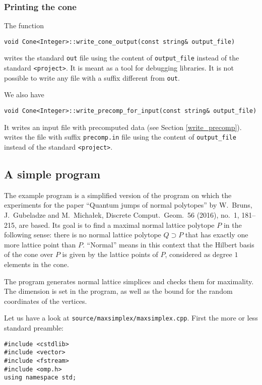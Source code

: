 \begin{small}
\subsubsection{Printing the cone}

The function
\begin{Verbatim}
void Cone<Integer>::write_cone_output(const string& output_file)
\end{Verbatim}
writes the standard \verb|out| file using the content of \verb|output_file| instead of the standard \verb|<project>|. It is meant as a tool for debugging libraries. It is not possible to write any file with a suffix different from \verb|out|.

We also have
\begin{Verbatim}
void Cone<Integer>::write_precomp_for_input(const string& output_file)
\end{Verbatim}
It writes an input file with precomputed data (see Section \ref{write_precomp}).
writes the file with suffix  \verb|precomp.in| file using the content of \verb|output_file| instead of the standard \verb|<project>|.

\subsection{A simple program}\label{maxsimplex}

The example program is a simplified version of the program on which the experiments for the paper ``Quantum jumps of normal polytopes'' by W.~Bruns, J.~Gubeladze and M.~Micha\l{}ek, Discrete Comput.\ Geom.\ 56 (2016), no.\ 1, 181--215, are based. Its goal is to find a maximal normal lattice polytope $P$ in the following sense: there is no normal lattice polytope $Q\supset P$ that has exactly one more lattice point than $P$. ``Normal'' means in this context that the Hilbert basis of the cone over $P$ is given by the lattice points of $P$, considered as degree $1$ elements in the cone.

The program generates normal lattice simplices and checks them for maximality. The dimension is set in the program, as well as the bound for the random coordinates of the vertices.

Let us have a look at \verb|source/maxsimplex/maxsimplex.cpp|. First the more or less standard preamble:

\begin{Verbatim}
#include <cstdlib>
#include <vector>
#include <fstream>
#include <omp.h>
using namespace std;


\end{Verbatim}
\end{small}
